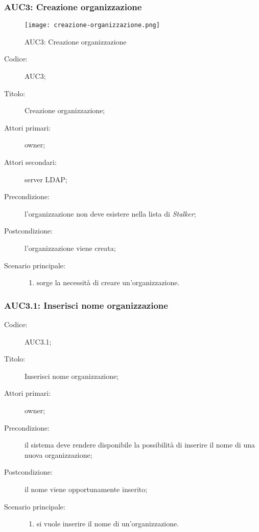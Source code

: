 \documentclass[../../../analisi-dei-requisiti.tex]{subfiles}
\begin{document}
\subsubsection{AUC3: Creazione organizzazione}%
\label{subs:AUC3}

\begin{figure}[H]
  \centering
  \texttt{[image: creazione-organizzazione.png]}
  \caption{AUC3: Creazione organizzazione}%
  \label{fig:AUC3}
\end{figure}

\begin{description}
  \item[Codice:] AUC3;
  \item[Titolo:] Creazione organizzazione;
  \item[Attori primari:] owner;
  \item[Attori secondari:] server LDAP\@;
  \item[Precondizione:] l'organizzazione non deve esistere nella lista di \emph{Stalker};
  \item[Postcondizione:] l'organizzazione viene creata;
  \item[Scenario principale:]
        \begin{enumerate}
          \item sorge la necessità di creare un'organizzazione.
        \end{enumerate}
\end{description}

\subsubsection{AUC3.1: Inserisci nome organizzazione}%
\label{subs:AUC3.1}
\begin{description}
  \item[Codice:] AUC3.1;
  \item[Titolo:] Inserisci nome organizzazione;
  \item[Attori primari:]  owner;
  \item[Precondizione:] il sistema deve rendere disponibile la possibilità di inserire il nome di una nuova organizzazione;
  \item[Postcondizione:] il nome viene opportunamente inserito;
  \item[Scenario principale:]
        \begin{enumerate}
          \item si vuole inserire il nome di un'organizzazione.
        \end{enumerate}

\end{description}
\end{document}
